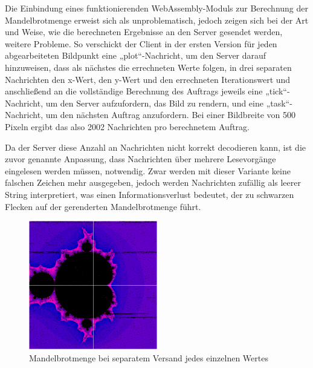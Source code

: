 \documentclass[12pt, onecolumn, notitlepage]{scrartcl}
\begin{document}
Die Einbindung eines funktionierenden WebAssembly-Moduls zur Berechnung der Mandelbrotmenge erweist sich als unproblematisch, jedoch zeigen sich bei der Art und Weise, wie die berechneten Ergebnisse an den Server gesendet werden, weitere Probleme. So verschickt der Client in der ersten Version für jeden abgearbeiteten Bildpunkt eine „plot“-Nachricht, um den Server darauf hinzuweisen, dass als nächstes die errechneten Werte folgen, in drei separaten Nachrichten den x-Wert, den y-Wert und den errechneten Iterationswert und anschließend an die vollständige Berechnung des Auftrags jeweils eine „tick“-Nachricht, um den Server aufzufordern, das Bild zu rendern, und eine „task“-Nachricht, um den nächsten Auftrag anzufordern. Bei einer Bildbreite von 500 Pixeln ergibt das also 2002 Nachrichten pro berechnetem Auftrag. \par

Da der Server diese Anzahl an Nachrichten nicht korrekt decodieren kann, ist die zuvor genannte Anpassung, dass Nachrichten über mehrere Lesevorgänge eingelesen werden müssen, notwendig. Zwar werden mit dieser Variante keine falschen Zeichen mehr ausgegeben, jedoch werden Nachrichten zufällig als leerer String interpretiert, was einen Informationsverlust bedeutet, der zu schwarzen Flecken auf der gerenderten Mandelbrotmenge führt. \par

\begin{figure}[htbp] 
	\centering
	\includegraphics[width=0.5\textwidth]{einzelnVersandt.PNG}
	\caption{Mandelbrotmenge bei separatem Versand jedes einzelnen Wertes}
	\label{fig:Bild1}
\end{figure}
\end{document}
